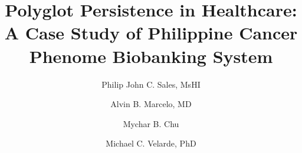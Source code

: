 \documentclass[5p,times,authoryear]{elsarticle}
\begin{document}
\begin{frontmatter}






\title{Polyglot Persistence in Healthcare:\\
A Case Study of Philippine Cancer Phenome Biobanking System}



\author[First]{Philip John C. Sales, MsHI}

\author[First]{Alvin B. Marcelo, MD}

\author[Third]{Mychar B. Chu}

\author[Second]{Michael C. Velarde, PhD }



\address[First]{University of the Philippines - Manila, College of Medicine, Medical Informatics Unit. }
\address[Second]{University of the Philippines - Diliman, Institute of Biology, Regen Laboratory.}
\address[Third]{University of the Philippines - Manila, Philippine General Hospital, General Surgery Department.}


\end{frontmatter}
\end{document}

